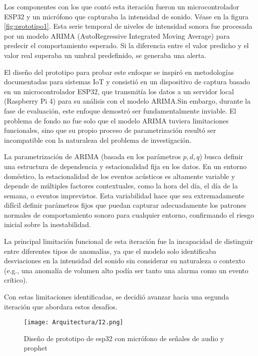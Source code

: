 Los componentes con los que contó esta iteración fueron un microcontrolador ESP32 y un micrófono que capturaba la intensidad de sonido. Véase en la figura \ref{fig:prototipo1}. Esta serie temporal de niveles de intensidad sonora fue procesada por un modelo ARIMA (AutoRegressive Integrated Moving Average) para predecir el comportamiento esperado. Si la diferencia entre el valor predicho y el valor real superaba un umbral predefinido, se generaba una alerta.

El diseño del prototipo para probar este enfoque se inspiró en metodologías documentadas para sistemas IoT \cite{luis2024desarrollo} y consistió en un dispositivo de captura basado en un microcontrolador ESP32, que transmitía los datos a un servidor local (Raspberry Pi 4) para su análisis con el modelo ARIMA.Sin embargo, durante la fase de evaluación, este enfoque demostró ser fundamentalmente inviable. El problema de fondo no fue solo que el modelo ARIMA tuviera limitaciones funcionales, sino que su propio proceso de parametrización resultó ser incompatible con la naturaleza del problema de investigación.

La parametrización de ARIMA (basada en los parámetros $p, d, q$) busca definir una estructura de dependencia y estacionalidad fija en los datos. En un entorno doméstico, la estacionalidad de los eventos acústicos es altamente variable y depende de múltiples factores contextuales, como la hora del día, el día de la semana, o eventos imprevistos. Esta variabilidad hace que sea extremadamente difícil definir parámetros fijos que puedan capturar adecuadamente los patrones normales de comportamiento sonoro para cualquier entorno, confirmando el riesgo inicial sobre la inestabilidad.

La principal limitación funcional de esta iteración fue la incapacidad de distinguir entre diferentes tipos de anomalías, ya que el modelo solo identificaba desviaciones en la intensidad del sonido sin considerar su naturaleza o contexto (e.g., una anomalía de volumen alto podía ser tanto una alarma como un evento crítico).

Con estas limitaciones identificadas, se decidió avanzar hacia una segunda iteración que abordara estos desafíos.


      \begin{figure}[ht!]
            \centering
            \texttt{[image: Arquitectura/I2.png]}
            \caption{Diseño de prototipo de esp32 con micrófono de señales de audio y prophet}
            \label{fig:prototipo2}
      \end{figure}

